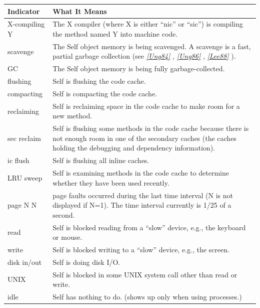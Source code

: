 \documentclass[letterpaper,10pt,english]{sphinxmanual}
\begin{document}
\begin{tabulary}{\linewidth}{p{5cm} p{10cm}}
\hline
\textbf{
Indicator
} & \textbf{
What It Means
}\\\hline

X-compiling Y
 & 
The X compiler (where X is either “nic” or “sic”) is compiling the method named Y into machine
code.
\\\hline

scavenge
 & 
The Self object memory is being scavenged. A scavenge is a fast, partial garbage collection (see
{\hyperref[ref:citations]{\emph{{[}Ung84{]}}}} , {\hyperref[ref:citations]{\emph{{[}Ung86{]}}}} , {\hyperref[ref:citations]{\emph{{[}Lee88{]}}}} ).
\\\hline

GC
 & 
The Self object memory is being fully garbage-collected.
\\\hline

flushing
 & 
Self is flushing the code cache.
\\\hline

compacting
 & 
Self is compacting the code cache.
\\\hline

reclaiming
 & 
Self is reclaiming space in the code cache to make room for a new method.
\\\hline

sec reclaim
 & 
Self is flushing some methods in the code cache because there is not enough room in one of the
secondary caches (the caches holding the debugging and dependency information).
\\\hline

ic flush
 & 
Self is flushing all inline caches.
\\\hline

LRU sweep
 & 
Self is examining methods in the code cache to determine whether they have been used recently.
\\\hline

page N N
 & 
page faults occurred during the last time interval (N is not displayed if N=1). The time interval
currently is 1/25 of a second.
\\\hline

read
 & 
Self is blocked reading from a “slow” device, e.g., the keyboard or mouse.
\\\hline

write
 & 
Self is blocked writing to a “slow” device, e.g., the screen.
\\\hline

disk in/out
 & 
Self is doing disk I/O.
\\\hline

UNIX
 & 
Self is blocked in some UNIX system call other than read or write.
\\\hline

idle
 & 
Self has nothing to do. (shows up only when using processes.)
\\\hline
\end{tabulary}
\end{document}
